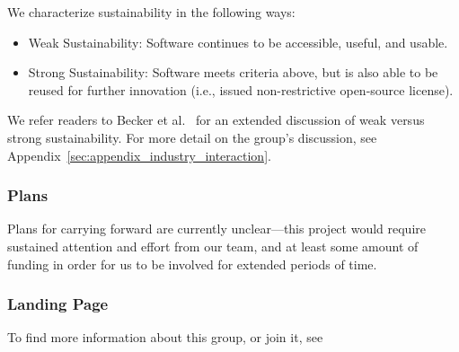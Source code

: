 We characterize sustainability in the following ways:
\begin{itemize}

\item Weak Sustainability: Software continues to be accessible, useful, and
usable.

\item Strong Sustainability: Software meets criteria above, but is also able to
be reused for further innovation (i.e., issued non-restrictive open-source
license).

\end{itemize}
We refer readers to Becker et al.~\cite{Becker:2014} for an extended discussion of weak versus strong
sustainability. For more detail on the group's discussion, see
Appendix~\ref{sec:appendix_industry_interaction}.

\subsubsection{Plans}

Plans for carrying forward are currently unclear---this project would require
sustained attention and effort from our team, and at least some amount of
funding in order for us to be involved for extended periods of time.

\subsubsection{Landing Page}

To find more information about this group, or join it, see 
